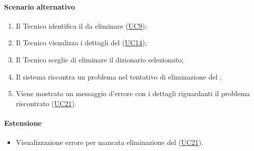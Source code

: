 \paragraph*{Scenario alternativo}
\begin{enumerate}
  \item Il Tecnico identifica il  da eliminare (\hyperref[UC9]{UC9});
  \item Il Tecnico visualizza i dettagli del  (\hyperref[UC14]{UC14});  
  \item Il Tecnico sceglie di eliminare il dizionario selezionato;
  \item Il sistema riscontra un problema nel tentativo di eliminazione del ;
  \item Viene mostrato un messaggio d'errore con i dettagli riguardanti il problema riscontrato (\hyperref[UC21]{UC21}).
\end{enumerate}

\paragraph*{Estensione}
\begin{itemize}
  \item Visualizzazione errore per mancata eliminazione del  (\hyperref[UC21]{UC21}).
\end{itemize}

